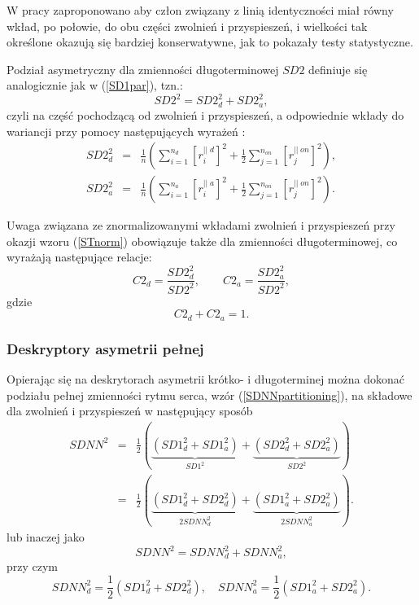 W pracy \cite{annals} zaproponowano aby człon związany z linią identyczności miał
równy wkład, po połowie, do obu części zwolnień i przyspieszeń, i wielkości tak określone
okazują się bardziej konserwatywne, jak to pokazały testy statystyczne.
 
Podział asymetryczny dla zmienności długoterminowej $SD2$ definiuje się analogicznie jak w 
 (\ref{SD1par}), tzn.:
\begin{equation}
SD2^{2}=SD2_{d}^{2}+SD2_{a}^{2}, \label{SD2part}
\end{equation}
czyli na część pochodzącą od zwolnień i przyspieszeń, a odpowiednie wkłady do wariancji
przy pomocy następujących wyrażeń \cite{annals}:
\begin{eqnarray}
SD2_{d}^{2}&=&\frac{1}{n}\left(\sum_{i=1}^{n_{d}}[r^{||\;d}_{i}]^{2}+\frac{1}{2}\sum_{j=1}^{n_{on}}[r^{||\;on}_{j}]^{2}\right),\label{LTpartdef}\\
SD2_{a}^{2}&=&\frac{1}{n}\left(\sum_{i=1}^{n_{a}}[r^{||\;a}_{i}]^{2}+\frac{1}{2}\sum_{j=1}^{n_{on}}[r^{||\;on}_{j}]^{2}\right). \nonumber
\end{eqnarray}

Uwaga związana ze znormalizowanymi wkładami zwolnień i przyspieszeń przy okazji wzoru (\ref{STnorm})
obowiązuje także dla zmienności długoterminowej, co wyrażają następujące relacje:
\begin{equation}
C2_{d}=\frac{SD2_{d}^{2}}{SD2^{2}}, \qquad C2_{a}=\frac{SD2_{a}^{2}}{SD2^{2}},\label{LTnorm}
\end{equation}
gdzie
\begin{equation}
C2_{d}+C2_{a}=1.
\end{equation}

\subsubsection{Deskryptory asymetrii pełnej}
Opierając się na deskrytorach asymetrii krótko- i długoterminej można dokonać podziału
pełnej zmienności rytmu serca, wzór (\ref{SDNNpartitioning}), na składowe dla zwolnień i
przyspieszeń w następujący sposób \cite{annals}
\begin{eqnarray}
SDNN^{2}&=&\frac{1}{2}\left(\underbrace{(SD1_{d}^{2}+SD1_{a}^{2})}_{SD1^{2}}+\underbrace{(SD2_{d}^{2}+SD2_{a}^{2})}_{SD2^{2}}\right)\\
&=&\frac{1}{2}\left(\underbrace{(SD1_{d}^{2}+SD2_{d}^{2})}_{2SDNN_{d}^{2}}+\underbrace{(SD1_{a}^{2}+SD2_{a}^{2})}_{2 SDNN_{a}^{2}}\right).\nonumber
\end{eqnarray}
lub inaczej jako
\begin{equation}
SDNN^{2}=SDNN_{d}^{2}+SDNN_{a}^{2}, \label{SDNNpart}
\end{equation}
przy czym 
\begin{equation}
SDNN_{d}^2=\frac{1}{2}\left(SD1_{d}^{2}+SD2_{d}^{2}\right),\quad SDNN_{a}^2=\frac{1}{2}\left(SD1_{a}^{2}+SD2_{a}^{2}\right). \label{SDNNpartad}
\end{equation}

